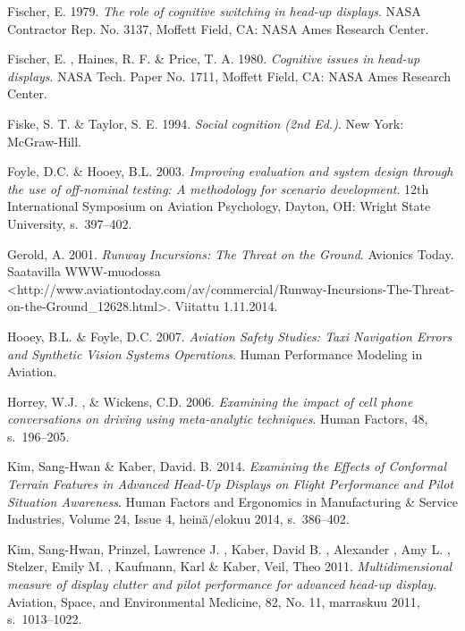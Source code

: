 \documentclass[utf8,bachelor,manualbib]{gradu3}
\begin{document}
\begin{thebibliography}{}
Fischer, E. 1979.
\textit{The role of cognitive switching in head-up displays}.
NASA Contractor Rep. No. 3137, Moffett Field, CA: NASA Ames Research Center.

Fischer, E. , Haines, R. F. \& Price, T. A. 1980.
\textit{Cognitive issues in head-up displays}.
NASA Tech. Paper No. 1711, Moffett Field, CA: NASA Ames Research Center.

Fiske, S. T. \& Taylor, S. E. 1994.
\textit{Social cognition (2nd Ed.)}.
New York: McGraw-Hill.

Foyle, D.C. \& Hooey, B.L. 2003.
\textit{Improving evaluation and system design through the use of off-nominal testing: A methodology for scenario development}.
12th International Symposium on Aviation Psychology, Dayton, OH: Wright State University, s.~397--402.

Gerold, A. 2001.
\textit{Runway Incursions: The Threat on the Ground}.
Avionics Today.
Saatavilla WWW-muodossa
<http://www.aviationtoday.com/av/commercial/Runway-Incursions-The-Threat-on-the-Ground\_12628.html>. Viitattu 1.11.2014.

Hooey, B.L. \& Foyle, D.C. 2007.
\textit{Aviation Safety Studies: Taxi Navigation Errors and Synthetic Vision Systems Operations}.
Human Performance Modeling in Aviation.

Horrey, W.J. , \& Wickens, C.D. 2006.
\textit{Examining the impact of cell phone conversations on driving using meta-analytic techniques}.
Human Factors, 48, s.~196--205.

Kim, Sang-Hwan \& Kaber, David. B. 2014.
\textit{Examining the Effects of Conformal Terrain Features in Advanced Head-Up Displays on Flight Performance and Pilot Situation Awareness}.
Human Factors and Ergonomics in Manufacturing \& Service Industries, Volume 24, Issue 4, heinä/elokuu 2014, s.~386--402.

Kim, Sang-Hwan, Prinzel, Lawrence J. , Kaber, David B. , Alexander , Amy L. , Stelzer, Emily M. , Kaufmann, Karl \& Kaber, Veil, Theo 2011.
\textit{Multidimensional measure of display clutter and pilot performance for advanced head-up display}.
Aviation, Space, and Environmental Medicine, 82, No. 11, marraskuu 2011, s.~1013--1022.


\end{thebibliography}
\end{document}
